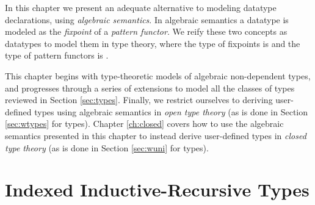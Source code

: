 \documentclass[12pt]{report}
\newcommand{\refch}[1]{Chapter \ref{ch:#1}}
\newcommand{\refsec}[1]{Section \ref{sec:#1}}
\newcommand{\AgdaData}[1]{\AgdaDatatype{#1}}
\theoremstyle{definition}
\theoremstyle{remark}
\numberwithin{definition}{section}
\numberwithin{equation}{section}
\numberwithin{proposition}{section}
\numberwithin{conjecture}{section}
\numberwithin{theorem}{section}
\numberwithin{lemma}{section}
\numberwithin{corollary}{section}
\numberwithin{example}{section}
\numberwithin{remark}{section}
\begin{document}
In this chapter we present an adequate alternative to modeling
datatype declarations, using \textit{algebraic semantics}. In
algebraic semantics a datatype is modeled as the \textit{fixpoint}
of a \textit{pattern functor}. We reify these two concepts as
datatypes to model them in type theory, where the type of fixpoints is
\AgdaData{μ} and the type of pattern functors is \AgdaData{Desc}.

This chapter begins with type-theoretic models of algebraic
non-dependent types, and progresses through a series of
extensions to model all the classes of types reviewed in
\refsec{types}. Finally, we restrict ourselves to deriving
user-defined types using algebraic semantics in
\textit{open type theory} (as is done in \refsec{wtypes} for
\AgdaData{W} types).
\refch{closed} covers how to use the
algebraic semantics presented in this chapter to instead derive
user-defined types in \textit{closed type theory} (as is done
in \refsec{wuni} for \AgdaData{W} types).






\section{Indexed Inductive-Recursive Types}\label{sec:iiralg}





\end{document}
